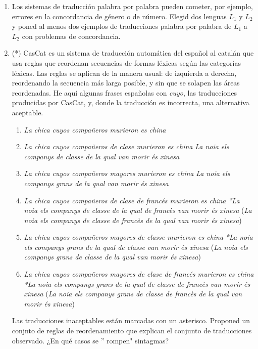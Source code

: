 \begin{enumerate} \item Los sistemas de traducción palabra por palabra pueden cometer, por ejemplo, errores en la concordancia de género o de número. Elegid dos lenguas $L_1$ y $L_2$ y poned al menos dos ejemplos de traducciones palabra por palabra de $L_1$ a $L_2$ con problemas de concordancia. 

\item (*) \label{ex:cascat} CasCat es un sistema de traducción automática del español al catalán que usa reglas que reordenan secuencias de formas léxicas según las categorías léxicas. Las reglas se aplican de la manera usual: de izquierda a derecha, reordenando la secuencia más larga posible, y sin que se solapen las áreas reordenadas. He aquí algunas frases españolas con {\em cuyo}, las traducciones producidas por CasCat, y, donde la traducción es incorrecta, una alternativa aceptable. \begin{enumerate} \item \emph{La chica cuyos compañeros murieron es china}  \item \emph{La chica cuyos compañeros de clase murieron es china} \newline \emph{La noia els companys de classe de la qual van morir és xinesa} \item \emph{La chica cuyos compañeros mayores murieron es china} \newline \emph{La noia els companys grans de la qual van morir és xinesa} \item \emph{La chica cuyos compañeros de clase de francés murieron es china} \newline \emph{*La noia els companys de classe de la qual de francès van morir és xinesa} \newline (\emph{La noia els companys de classe de francès de la qual van morir és xinesa}) \item \emph{La chica cuyos compañeros mayores de classe murieron es china} \newline \emph{*La noia els companys grans de la qual de classe van morir és xinesa} \newline (\emph{La noia els companys grans de classe de la qual van morir és xinesa}) \item \emph{La chica cuyos compañeros mayores de clase de francés murieron es china} \newline \emph{*La noia els companys grans de la qual de classe de francès van morir és xinesa} \newline(\emph{La noia els companys grans de classe de francès de la qual van morir és xinesa}) \end{enumerate} Las traducciones inaceptables están marcadas con un asterisco. Proponed un conjnto de reglas de reordenamiento que explican el conjunto de traducciones observado. ¿En qué casos se '' rompen" sintagmas? 


\end{enumerate}
